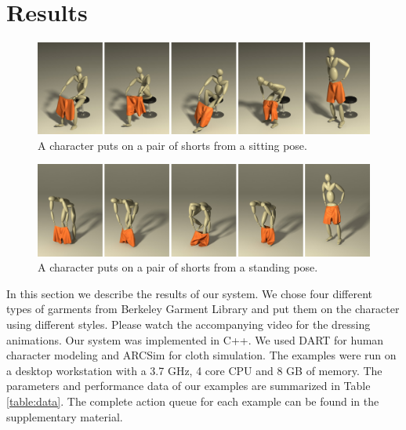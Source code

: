 \section{Results}

\begin{figure}[!t]
  \centering
  \includegraphics[width=\textwidth]{images/shortsSitting}
  \caption{A character puts on a pair of shorts from a sitting pose.}
  \label{fig:shorts1}
\end{figure}

\begin{figure}[!t]
  \centering
  \includegraphics[width=\textwidth]{images/shortsStanding}
  \caption{A character puts on a pair of shorts from a standing pose.}
  \label{fig:shorts2}
\end{figure}

In this section we describe the results of our system. We chose four different types of garments from Berkeley Garment Library \cite{}  and put them on the character using different styles. Please watch the accompanying video for the dressing animations. Our system was implemented in C++. We used DART \cite{} for human character modeling and ARCSim \cite{} for cloth simulation. The examples were run on a desktop workstation with a 3.7 GHz, 4 core CPU and 8 GB of memory. The parameters and performance data of our examples are summarized in Table \ref{table:data}. The complete action queue for each example can be found in the supplementary material.

